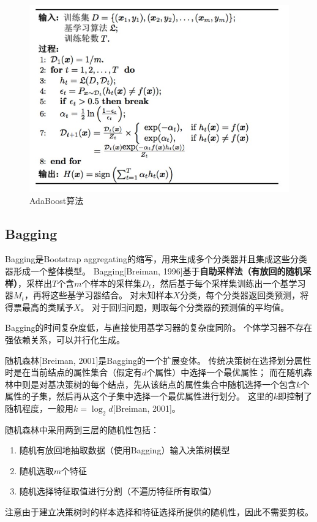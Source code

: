 \begin{figure}[H]
\centering
\includegraphics[width=0.8\linewidth]{fig/adaboost.jpg}
\caption{AdaBoost算法}
\end{figure}

\subsection{Bagging}
Bagging是Bootstrap aggregating的缩写，用来生成多个分类器并且集成这些分类器形成一个整体模型。
Bagging[Breiman, 1996]基于\textbf{自助采样法（有放回的随机采样）}，采样出$T$个含$m$个样本的采样集$D_t$，然后基于每个采样集训练出一个基学习器$M_t$，再将这些基学习器结合。
对未知样本$X$分类，每个分类器返回类预测，将得票最高的类赋予$X$。
对于回归问题，则取每个分类器的预测值的平均值。

Bagging的时间复杂度低，与直接使用基学习器的复杂度同阶。
个体学习器不存在强依赖关系，可以并行化生成。

随机森林[Breiman, 2001]是Bagging的一个扩展变体。
传统决策树在选择划分属性时是在当前结点的属性集合（假定有$d$个属性）中选择一个最优属性；
而在随机森林中则是对基决策树的每个结点，先从该结点的属性集合中随机选择一个包含$k$个属性的子集，然后再从这个子集中选择一个最优属性进行划分。
这里的$k$即控制了随机程度，一般用$k=\log_2 d$[Breiman, 2001]。

随机森林中采用两到三层的随机性包括：
\begin{enumerate}
	\item 随机有放回地抽取数据（使用Bagging）输入决策树模型
	\item 随机选取$m$个特征
	\item 随机选择特征取值进行分割（不遍历特征所有取值）
\end{enumerate}
注意由于建立决策树时的样本选择和特征选择所提供的随机性，因此不需要剪枝。


